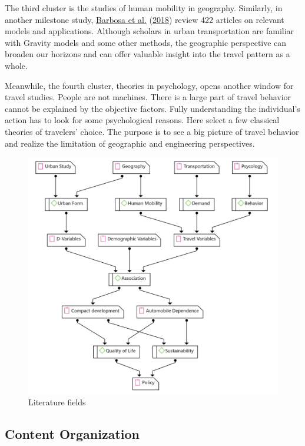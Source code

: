 \documentclass[
  12pt,
]{article}
\begin{document}
The third cluster is the studies of human mobility in geography.
Similarly, in another milestone study, \protect\hyperlink{ref-barbosaHumanMobilityModels2018}{Barbosa et al.} (\protect\hyperlink{ref-barbosaHumanMobilityModels2018}{2018}) review 422 articles on relevant models and applications.
Although scholars in urban transportation are familiar with Gravity models and some other methods, the geographic perspective can broaden our horizons and can offer valuable insight into the travel pattern as a whole.

Meanwhile, the fourth cluster, theories in psychology, opens another window for travel studies.
People are not machines. There is a large part of travel behavior cannot be explained by the objective factors.
Fully understanding the individual's action has to look for some psychological reasons.
Here select a few classical theories of travelers' choice.
The purpose is to see a big picture of travel behavior and realize the limitation of geographic and engineering perspectives.

\begin{figure}[ht]

{\centering \includegraphics[width=0.9\linewidth]{fig/concepts} 

}

\caption{Literature fields}\label{fig:fields}
\end{figure}

\hypertarget{content-organization}{%
\subsection{Content Organization}\label{content-organization}}
\end{document}
